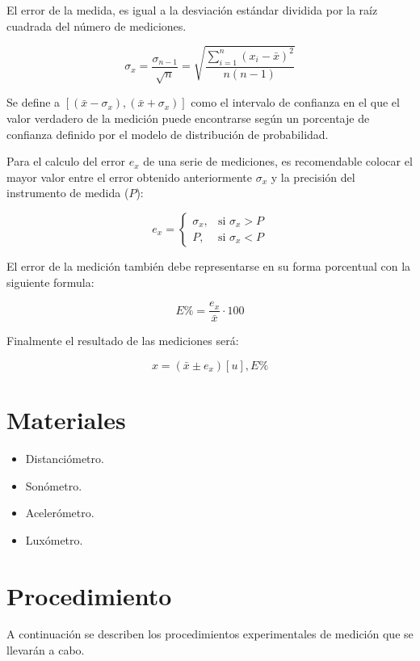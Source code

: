 \documentclass[letter,11pt]{article}
\begin{document}
El error de la medida, es igual a la desviación estándar dividida por la raíz
cuadrada del número de mediciones.

\begin{equation}
    \sigma_x = \frac{\sigma_{n-1}}{\sqrt{n}}
             = \sqrt{\frac{\sum_{i=1}^{n} (x_i-\bar{x})^2}{n(n-1)}}
\end{equation}

Se define a $[(\bar{x}-\sigma_x), (\bar{x}+\sigma_x)]$ como el intervalo de
confianza en el que el valor verdadero de la medición puede encontrarse según un
porcentaje de confianza definido por el modelo de distribución de probabilidad.

Para el calculo del error $e_x$ de una serie de mediciones, es recomendable
colocar el mayor valor entre el error obtenido anteriormente $\sigma_x$ y la
precisión del instrumento de medida ($P$):

\begin{equation}
    e_x = \begin{cases}
        \sigma_x, & \mbox{si }\sigma_x > P \\
        P,        & \mbox{si }\sigma_x < P
    \end{cases}
\end{equation}

El error de la medición también debe representarse en su forma porcentual con la
siguiente formula:

\begin{equation}
    E\% = \frac{e_x}{\bar{x}}\cdot100
\end{equation}

Finalmente el resultado de las mediciones será:

\begin{equation}
    x = (\bar{x}\pm e_x)[u], E\%
\end{equation}

\section{Materiales}
\begin{itemize}
\item Distanciómetro.
\item Sonómetro.
\item Acelerómetro.
\item Luxómetro.
\end{itemize}

\section{Procedimiento}
A continuación se describen los procedimientos experimentales de medición que se
llevarán a cabo.
\end{document}
